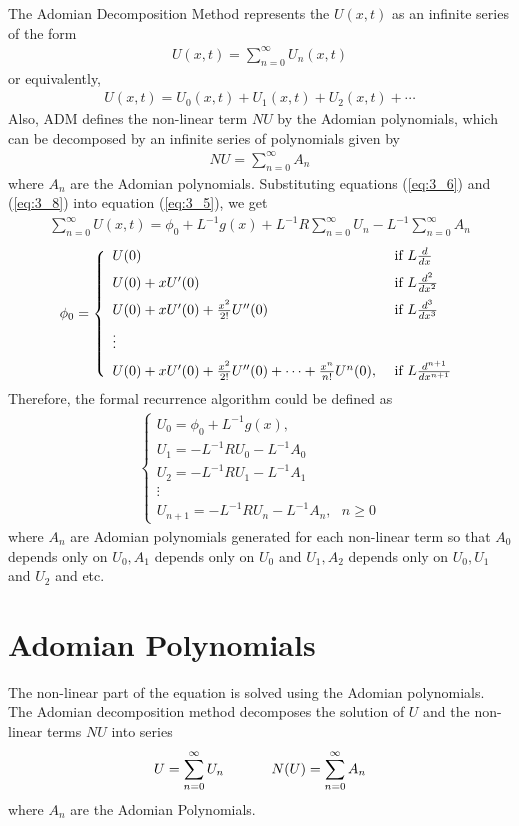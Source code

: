 \documentclass[11pt]{report}
\newcommand{\sps}{\\[0.2cm]}
\newcommand{\refn}[1]{(\ref{#1})}
\newcommand{\refx}[1]{\refn{eq:#1}}
\newcommand{\NI}{\noindent}
\newcommand{\sprime}{'}
\newcommand{\dprime}{''}
\begin{document}
	\NI The Adomian Decomposition Method represents the $U(x,t)$ as an infinite series of the form
	\begin{eqnarray}
		U(x,t) = \sum_{n=0}^{\infty}U_n(x,t)\label{eq:3_6}
	\end{eqnarray}
	or equivalently,
	\begin{eqnarray}
		U(x,t) = U_0(x,t) + U_1(x,t) + U_2(x,t) + \cdots
	\end{eqnarray}
	Also, ADM defines the non-linear term $NU$ by the Adomian polynomials, which can be decomposed by an infinite series of polynomials given by
	\begin{eqnarray}
		NU = \sum_{n=0}^{\infty}A_n\label{eq:3_8}
	\end{eqnarray}
	where $A_n$ are the Adomian polynomials. Substituting equations \refx{3_6} and \refx{3_8} into equation \refx{3_5}, we get
	\begin{eqnarray}
		\sum_{n=0}^{\infty}U(x,t) = \phi_0 + L^{-1}g(x) + L^{-1} R\sum_{n=0}^{\infty}U_n - L^{-1}\sum_{n=0}^{\infty}A_n
	\end{eqnarray}
	\begin{eqnarray}
		\phi_0 = \left\{
			\begin{array}{l l}
				U(0) & \text{ if } L \frac{d}{dx}\sps
				U(0) + xU\sprime(0) & \text{ if } L \frac{d^2}{dx^2}\sps
				U(0) + xU\sprime(0) + \frac{x^2}{2!}U\dprime(0) & \text{ if } L \frac{d^3}{dx^3}\sps
				\vdots\sps
				U(0) + xU\sprime(0) + \frac{x^2}{2!}U\dprime(0) + \cdots + \frac{x^n}{n!}U^n(0), & \text{ if } L \frac{d^{n+1}}{dx^{n+1}}
			\end{array}
		\right.
	\end{eqnarray}
	Therefore, the formal recurrence algorithm could be defined as
	\begin{eqnarray}
		\left\{
			\begin{array}{l}
				U_0 = \phi_0 + L^{-1} g(x),\sps
				U_1 = - L^{-1}RU_0 - L^{-1}A_0\sps
				U_2 = - L^{-1} RU_1 - L^{-1}A_1\\
				\vdots\\
				U_{n+1} = -L^{-1}RU_n - L^{-1}A_n,~~~ n\geq 0
			\end{array}
		\right.
	\end{eqnarray}
	where $A_n$ are Adomian polynomials generated for each non-linear term so that $A_0$ depends only on $U_0, A_1$ depends only on $U_0$ and $U_1, A_2$ depends only on $U_0,U_1$ and $U_2$ and etc.

	\section{Adomian Polynomials}
	The non-linear part of the equation is solved using the Adomian polynomials. The Adomian decomposition method decomposes the solution of $U$ and the non-linear terms $NU$ into series
	\begin{eqnarray}
		U = \sum_{n=0}^{\infty}U_n \hspace{1.2cm} N(U) = \sum_{n=0}^{\infty}A_n
	\end{eqnarray}
	where $A_n$ are the Adomian Polynomials.\\
	
\end{document}
